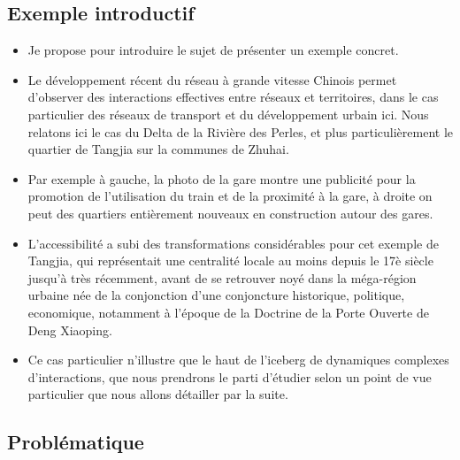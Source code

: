 \documentclass[11pt]{article}
\begin{document}
\subsection*{Exemple introductif}



\begin{itemize}
	\item Je propose pour introduire le sujet de présenter un exemple concret.
	\item Le développement récent du réseau à grande vitesse Chinois permet d'observer des interactions effectives entre réseaux et territoires, dans le cas particulier des réseaux de transport et du développement urbain ici. Nous relatons ici le cas du Delta de la Rivière des Perles, et plus particulièrement le quartier de Tangjia sur la communes de Zhuhai.
	\item Par exemple à gauche, la photo de la gare montre une publicité pour la promotion de l'utilisation du train et de la proximité à la gare, à droite on peut des quartiers entièrement nouveaux en construction autour des gares.
	\item L'accessibilité a subi des transformations considérables pour cet exemple de Tangjia, qui représentait une centralité locale au moins depuis le 17è siècle jusqu'à très récemment, avant de se retrouver noyé dans la méga-région urbaine née de la conjonction d'une conjoncture historique, politique, economique, notamment à l'époque de la Doctrine de la Porte Ouverte de Deng Xiaoping.
	\item Ce cas particulier n'illustre que le haut de l'iceberg de dynamiques complexes d'interactions, que nous prendrons le parti d'étudier selon un point de vue particulier que nous allons détailler par la suite.
\end{itemize}





\subsection*{Problématique}
\end{document}
